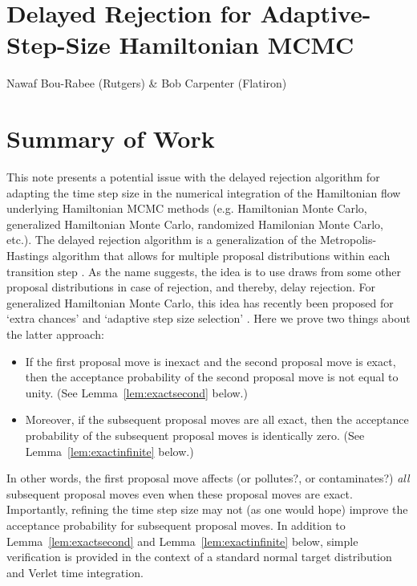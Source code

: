 \documentclass[11pt]{article}
\theoremstyle{plain}%
\begin{document}
\pagestyle{empty} 

\section*{Delayed Rejection for Adaptive-Step-Size Hamiltonian MCMC}

Nawaf Bou-Rabee (Rutgers) \& Bob Carpenter (Flatiron) 

\section*{Summary of Work}

This note presents a potential issue with the delayed rejection algorithm for adapting the time step size in the numerical integration of the Hamiltonian flow underlying Hamiltonian MCMC methods (e.g. Hamiltonian Monte Carlo, generalized Hamiltonian Monte Carlo, randomized Hamilonian Monte Carlo, etc.).   The delayed rejection algorithm is a generalization of the Metropolis-Hastings algorithm that allows for multiple proposal distributions within each transition step \cite{mira2001metropolis,green2001delayed}.  As the name suggests, the idea is to use draws from some other proposal distributions in case of rejection, and thereby, delay  rejection.  For generalized Hamiltonian Monte Carlo, this idea has recently been proposed for `extra chances' \cite{campos2015extra} and `adaptive step size selection' \cite{ChBaCa2023}.  Here we prove two things about the latter approach: \begin{itemize}
\item If the first proposal move is inexact and the second proposal move is exact, then the acceptance probability of the second proposal move is not equal to unity.  (See Lemma~\ref{lem:exactsecond} below.)
\item Moreover, if the subsequent proposal moves are all exact, then the acceptance probability of the subsequent proposal moves is identically zero.  (See Lemma~\ref{lem:exactinfinite} below.)
\end{itemize}
In other words, the first proposal move affects (or pollutes?, or contaminates?) \emph{all} subsequent proposal moves even when these proposal moves are exact.  Importantly, refining the time step size may not (as one would hope) improve the acceptance probability for subsequent proposal moves.  In addition to  Lemma~\ref{lem:exactsecond} and Lemma~\ref{lem:exactinfinite} below, simple  verification is provided in the context of a standard normal target distribution and Verlet time integration.   
\end{document}

